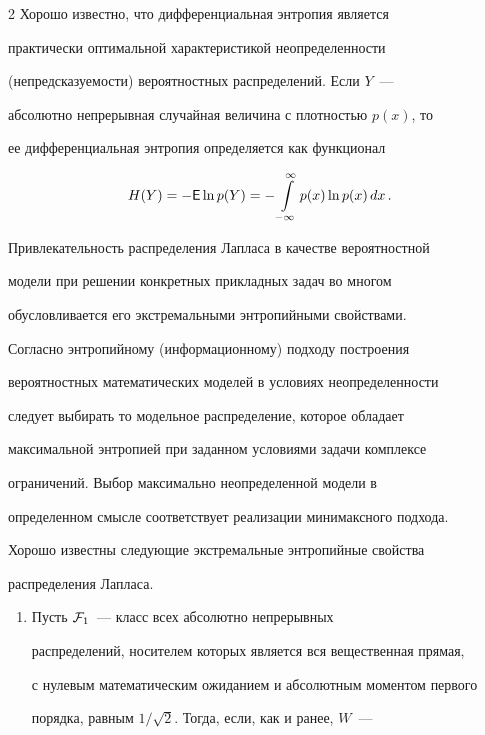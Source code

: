 \begin{multicols}{2}
Хорошо известно, что дифференциальная энт\-ро\-пия является


практически оптимальной характеристикой неопределенности


(не\-пред\-ска\-зу\-емости) вероятностных распределений. Если $Y$~---


абсолютно непрерывная случайная величина с плотностью $p(x)$, то


ее дифференциальная энтропия определяется как функционал


$$


H(Y)=-{\sf E}\ln p(Y)=-\int\limits_{-\infty}^{\infty}p(x)\ln


p(x)\,dx\,.


$$





Привлекательность распределения Лапласа в качестве вероятностной


модели при решении конкретных прикладных задач во многом


обусловливается его экстремальными энтропийными свойствами.


Согласно энтропийному (информационному) подходу построения


вероятностных математических моделей в условиях неопределенности


следует выбирать то модельное распределение, которое обладает


максимальной энтропией при заданном условиями задачи комплексе


ограничений. Выбор максимально неопределенной модели в


определенном смысле соответствует реализации минимаксного подхода.





Хорошо известны следующие экстремальные энтропийные свойства


распределения Лапласа.


\begin{enumerate}[1.]


\item  Пусть ${\cal F}_1$~--- класс всех абсолютно непрерывных


распределений, носителем которых является вся вещественная прямая,


с нулевым математическим ожиданием и абсолютным моментом первого


порядка, равным $1/\sqrt{2}$. Тогда, если, как и ранее, $W$~---



\end{enumerate}
\end{multicols}
